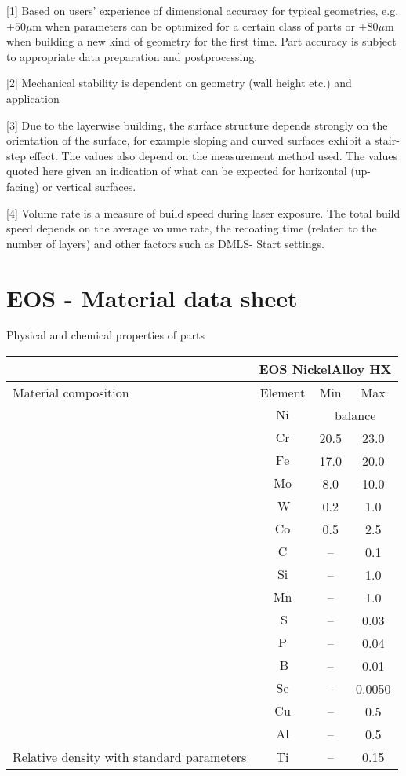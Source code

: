 \documentclass[10pt]{article}
\begin{document}
[1] Based on users' experience of dimensional accuracy for typical geometries, e.g. $\pm 50 \mu \mathrm{m}$ when parameters can be optimized for a certain class of parts or $\pm 80 \mu \mathrm{m}$ when building a new kind of geometry for the first time. Part accuracy is subject to appropriate data preparation and postprocessing.

[2] Mechanical stability is dependent on geometry (wall height etc.) and application

[3] Due to the layerwise building, the surface structure depends strongly on the orientation of the surface, for example sloping and curved surfaces exhibit a stair-step effect. The values also depend on the measurement method used. The values quoted here given an indication of what can be expected for horizontal (up-facing) or vertical surfaces.

[4] Volume rate is a measure of build speed during laser exposure. The total build speed depends on the average volume rate, the recoating time (related to the number of layers) and other factors such as DMLS- Start settings.

\section*{EOS - Material data sheet}
Physical and chemical properties of parts

\begin{center}
\begin{tabular}{lccc}
\hline
 & \multicolumn{3}{c}{EOS NickelAlloy HX} \\
\hline
Material composition & Element & Min & Max \\
\cline { 2 - 5 }
 & $\mathrm{Ni}$ & \multicolumn{2}{c}{balance} \\
 & $\mathrm{Cr}$ & 20.5 & 23.0 \\
 & $\mathrm{Fe}$ & 17.0 & 20.0 \\
 & $\mathrm{Mo}$ & 8.0 & 10.0 \\
 & $\mathrm{~W}$ & 0.2 & 1.0 \\
 & $\mathrm{Co}$ & 0.5 & 2.5 \\
 & $\mathrm{C}$ & -- & 0.1 \\
 & $\mathrm{Si}$ & -- & 1.0 \\
 & $\mathrm{Mn}$ & -- & 1.0 \\
 & $\mathrm{~S}$ & -- & 0.03 \\
 & $\mathrm{P}$ & -- & 0.04 \\
 & $\mathrm{~B}$ & -- & 0.01 \\
 & $\mathrm{Se}$ & -- & 0.0050 \\
 & $\mathrm{Cu}$ & -- & 0.5 \\
 & $\mathrm{Al}$ & -- & 0.5 \\
\hline
Relative density with standard parameters & Ti & -- & 0.15 \\
\hline
\end{tabular}
\end{center}
\end{document}

